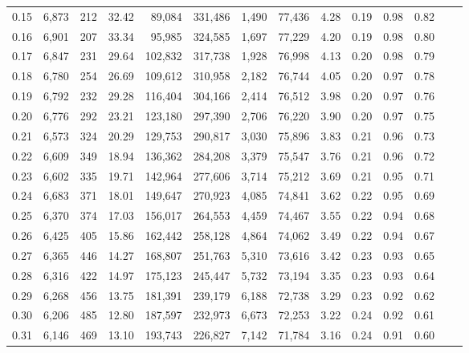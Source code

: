 \begin{tabular}{rrrrrrrrrrrrrr}
0.15 &  6,873 &    212 &    32.42 &   89,084 &  331,486 &   1,490 &  77,436 &  4.28 &  0.19 &  0.98 &      0.82 \\
0.16 &  6,901 &    207 &    33.34 &   95,985 &  324,585 &   1,697 &  77,229 &  4.20 &  0.19 &  0.98 &      0.80 \\
0.17 &  6,847 &    231 &    29.64 &  102,832 &  317,738 &   1,928 &  76,998 &  4.13 &  0.20 &  0.98 &      0.79 \\
0.18 &  6,780 &    254 &    26.69 &  109,612 &  310,958 &   2,182 &  76,744 &  4.05 &  0.20 &  0.97 &      0.78 \\
0.19 &  6,792 &    232 &    29.28 &  116,404 &  304,166 &   2,414 &  76,512 &  3.98 &  0.20 &  0.97 &      0.76 \\
0.20 &  6,776 &    292 &    23.21 &  123,180 &  297,390 &   2,706 &  76,220 &  3.90 &  0.20 &  0.97 &      0.75 \\
0.21 &  6,573 &    324 &    20.29 &  129,753 &  290,817 &   3,030 &  75,896 &  3.83 &  0.21 &  0.96 &      0.73 \\
0.22 &  6,609 &    349 &    18.94 &  136,362 &  284,208 &   3,379 &  75,547 &  3.76 &  0.21 &  0.96 &      0.72 \\
0.23 &  6,602 &    335 &    19.71 &  142,964 &  277,606 &   3,714 &  75,212 &  3.69 &  0.21 &  0.95 &      0.71 \\
0.24 &  6,683 &    371 &    18.01 &  149,647 &  270,923 &   4,085 &  74,841 &  3.62 &  0.22 &  0.95 &      0.69 \\
0.25 &  6,370 &    374 &    17.03 &  156,017 &  264,553 &   4,459 &  74,467 &  3.55 &  0.22 &  0.94 &      0.68 \\
0.26 &  6,425 &    405 &    15.86 &  162,442 &  258,128 &   4,864 &  74,062 &  3.49 &  0.22 &  0.94 &      0.67 \\
0.27 &  6,365 &    446 &    14.27 &  168,807 &  251,763 &   5,310 &  73,616 &  3.42 &  0.23 &  0.93 &      0.65 \\
0.28 &  6,316 &    422 &    14.97 &  175,123 &  245,447 &   5,732 &  73,194 &  3.35 &  0.23 &  0.93 &      0.64 \\
0.29 &  6,268 &    456 &    13.75 &  181,391 &  239,179 &   6,188 &  72,738 &  3.29 &  0.23 &  0.92 &      0.62 \\
0.30 &  6,206 &    485 &    12.80 &  187,597 &  232,973 &   6,673 &  72,253 &  3.22 &  0.24 &  0.92 &      0.61 \\
0.31 &  6,146 &    469 &    13.10 &  193,743 &  226,827 &   7,142 &  71,784 &  3.16 &  0.24 &  0.91 &      0.60 \\

\end{tabular}
